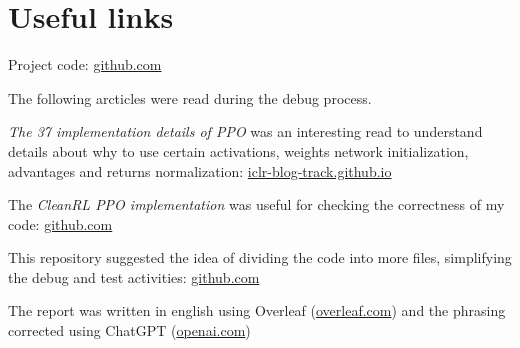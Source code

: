 \documentclass{article}
\begin{document}
\section{Useful links}
Project code: \href{https://github.com/ancaah/autonomous}{github.com}

The following arcticles were read during the debug process.

\textit{The 37 implementation details of PPO} was an interesting read to understand details about why to use certain activations, weights network initialization, advantages and returns normalization: \href{https://iclr-blog-track.github.io/2022/03/25/ppo-implementation-details/}{iclr-blog-track.github.io}

The \textit{CleanRL PPO implementation} was useful for checking the correctness of my code: \href{https://github.com/vwxyzjn/cleanrl/blob/master/cleanrl/ppo.py}{github.com}

This repository suggested the idea of dividing the code into more files, simplifying the debug and test activities: \href{https://github.com/philtabor/Youtube-Code-Repository/blob/master/ReinforcementLearning/PolicyGradient/PPO/tf2/memory.py}{github.com}

The report was written in english using Overleaf (\href{http://overleaf.com}{overleaf.com}) and the phrasing corrected using ChatGPT (\href{https://chat.openai.com}{openai.com})


\end{document}

